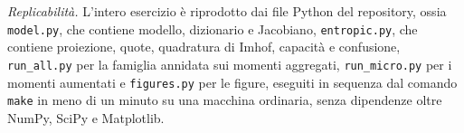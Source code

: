 \documentclass[11pt,a4paper]{article}
\begin{document}
\bigskip
\noindent\emph{Replicabilit\`a.} L'intero esercizio \`e riprodotto dai file Python del repository, ossia \texttt{model.py}, che contiene modello, dizionario e Jacobiano, \texttt{entropic.py}, che contiene proiezione, quote, quadratura di Imhof, capacit\`a e confusione, \texttt{run\_all.py} per la famiglia annidata sui momenti aggregati, \texttt{run\_micro.py} per i momenti aumentati e \texttt{figures.py} per le figure, eseguiti in sequenza dal comando \texttt{make} in meno di un minuto su una macchina ordinaria, senza dipendenze oltre NumPy, SciPy e Matplotlib.
\end{document}
